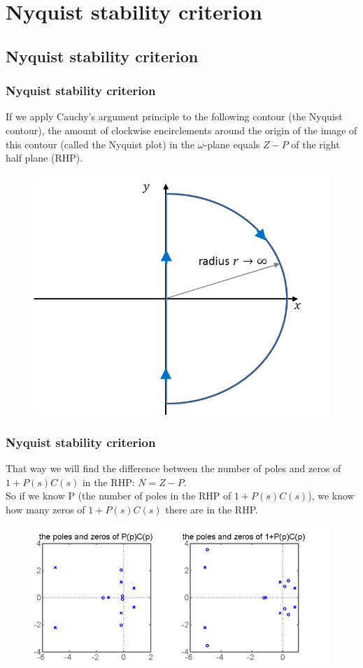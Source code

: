 \section{Nyquist stability criterion}

\subsection{Nyquist stability criterion}

\begin{frame}
	\frametitle{Nyquist stability criterion}
	If we apply Cauchy's argument principle to the following contour (the Nyquist contour), the amount of clockwise encirclements around the origin of the image of this contour (called the Nyquist plot) in the $\omega$-plane equals $Z-P$ of the right half plane (RHP).
	\begin{figure}
		\includegraphics[width=0.55\linewidth]{nyquist}
	\end{figure}
\end{frame}

\begin{frame}
	\frametitle{Nyquist stability criterion}
	That way we will find the difference between the number of poles and zeros of $1+P(s)C(s)$ in the RHP: $N=Z-P$.\\
	\medskip
	So if we know P (the number of poles in the RHP of $1+P(s)C(s)$), we know how many zeros of $1+P(s)C(s)$ there are in the RHP.
	\begin{figure}
		\includegraphics[width=0.8\linewidth]{pz}
	\end{figure}
\end{frame}

